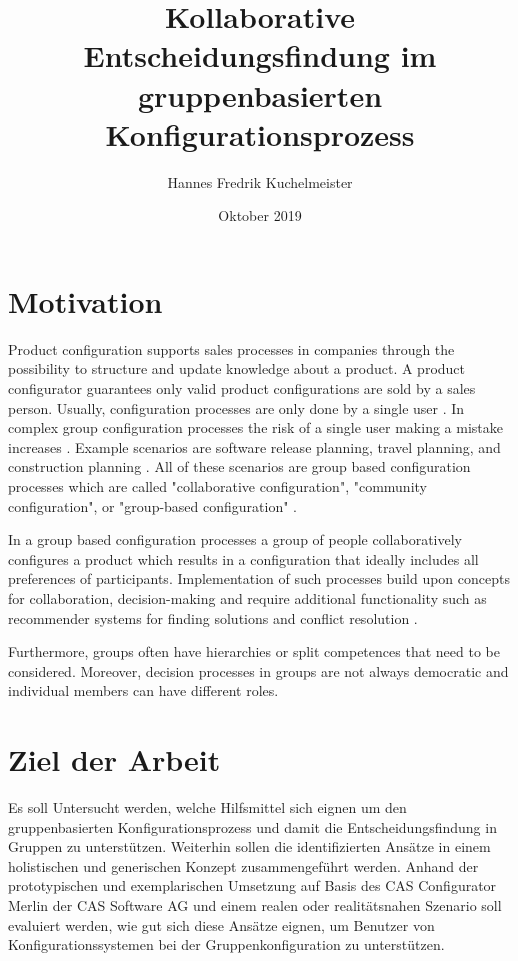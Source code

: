 \documentclass{article}
\title{Kollaborative Entscheidungsfindung im gruppenbasierten Konfigurationsprozess}
\author{Hannes Fredrik Kuchelmeister}
\date{Oktober 2019}
\begin{document}
\maketitle

\section{Motivation}

Product configuration supports sales processes in companies through the possibility to structure and update knowledge about a product. A product configurator guarantees only valid product configurations are sold by a sales person. Usually, configuration processes are only done by a single user \cite{felferningGroupBasedConfiguration2016, velasquez-guevaraMultiSPLOTSupportingMultiuser2018a}.
In complex group configuration processes the risk of a single user making a mistake increases \cite{felfernigGroupDecisionSupport2011}.
Example scenarios are software release planning, travel planning, and construction planning \cite{felfernigOpenConfiguration2014}. All of these scenarios are group based configuration processes which are called "collaborative configuration", "community configuration", or "group-based configuration" \cite{felferningGroupBasedConfiguration2016, felfernigOpenConfiguration2014,mendoncaCollaborativeProductConfiguration2008,felfernigKnowledgebasedConfigurationResearch2014}.

In a group based configuration processes a group of people collaboratively configures a product which results in a configuration that ideally includes all preferences of participants. Implementation of such processes build upon concepts for collaboration, decision-making and require additional functionality such as recommender systems for finding solutions and conflict resolution \cite{felfernigKnowledgebasedConfigurationResearch2014}.


Furthermore, groups often have hierarchies or split competences that need to be considered. Moreover, decision processes in groups are not always democratic and individual members can have different roles.

\section{Ziel der Arbeit}

Es soll Untersucht werden, welche Hilfsmittel sich eignen um den gruppenbasierten Konfigurationsprozess und damit die Entscheidungsfindung in Gruppen zu unterstützen. Weiterhin sollen die identifizierten Ansätze in einem holistischen und generischen Konzept zusammengeführt werden. Anhand der prototypischen und exemplarischen Umsetzung auf Basis des CAS Configurator Merlin der CAS Software AG und einem realen oder realitätsnahen Szenario soll evaluiert werden, wie gut sich diese Ansätze eignen, um Benutzer von Konfigurationssystemen bei der Gruppenkonfiguration zu unterstützen. 
\end{document}
